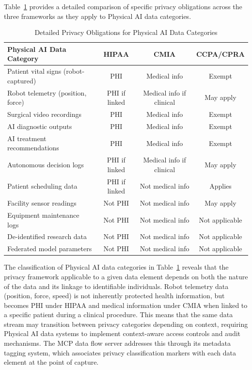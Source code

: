 Table~\ref{tab:privacy-detailed} provides a detailed comparison of specific
privacy obligations across the three frameworks as they apply to Physical AI
data categories.

\clearpage

\begin{table}[H]
\centering
\caption{Detailed Privacy Obligations for Physical AI Data Categories}
\label{tab:privacy-detailed}
\small
\begin{tabularx}{\textwidth}{l c c c}
\toprule
\textbf{Physical AI Data Category} & \textbf{HIPAA} & \textbf{CMIA} & \textbf{CCPA/CPRA} \\
\midrule
Patient vital signs (robot-captured) & PHI & Medical info & Exempt \\
Robot telemetry (position, force) & PHI if linked & Medical info if clinical & May apply \\
Surgical video recordings & PHI & Medical info & Exempt \\
AI diagnostic outputs & PHI & Medical info & Exempt \\
AI treatment recommendations & PHI & Medical info & Exempt \\
Autonomous decision logs & PHI if linked & Medical info if clinical & May apply \\
Patient scheduling data & PHI if linked & Not medical info & Applies \\
Facility sensor readings & Not PHI & Not medical info & May apply \\
Equipment maintenance logs & Not PHI & Not medical info & Not applicable \\
De-identified research data & Not PHI & Not medical info & Not applicable \\
Federated model parameters & Not PHI & Not medical info & Not applicable \\
\bottomrule
\end{tabularx}
\end{table}

The classification of Physical AI data categories in
Table~\ref{tab:privacy-detailed} reveals that the privacy framework
applicable to a given data element depends on both the nature of the data
and its linkage to identifiable individuals. Robot telemetry data
(position, force, speed) is not inherently protected health information, but
becomes PHI under HIPAA and medical information under CMIA when linked to a
specific patient during a clinical procedure. This means that the same data
stream may transition between privacy categories depending on context,
requiring Physical AI data systems to implement context-aware access controls
and audit mechanisms. The MCP data flow server \cite{national-mcp-paper}
addresses this through its metadata tagging system, which associates privacy
classification markers with each data element at the point of capture.

